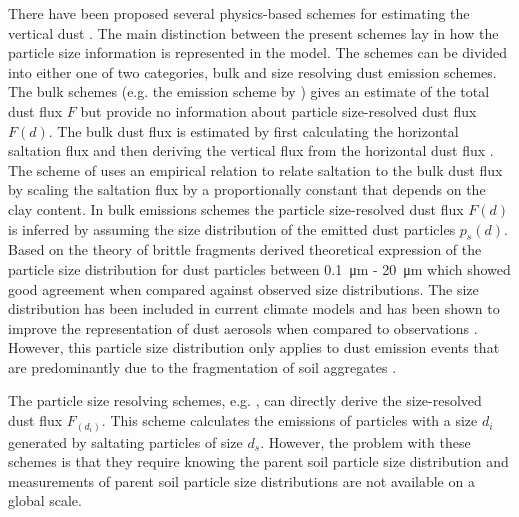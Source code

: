 There have been proposed several physics-based schemes for estimating the vertical dust \parencite{MB95_dust_emission,alfaro2001modeling,shao2004simplification}. The main distinction between the present schemes lay in how the particle size information is represented in the model. The schemes can be divided into either one of two categories, bulk and size resolving dust emission schemes. The bulk schemes (e.g. the emission scheme by \parencite{MB95_dust_emission}) gives an estimate of the total dust flux $F$ but provide no information about particle size-resolved dust flux $F(d)$. The bulk dust flux is estimated by first calculating the horizontal saltation flux and then deriving the vertical flux from the horizontal dust flux \parencite{tegen2014numerical}. The scheme of \textcite{MB95_dust_emission} uses an empirical relation to relate saltation to the bulk dust flux by scaling the saltation flux by a proportionally constant that depends on the clay content. In bulk emissions schemes the particle size-resolved dust flux $F(d)$ is inferred by assuming the size distribution of the emitted dust particles $p_s(d)$. Based on the theory of brittle fragments \textcite{kok_scaling_2011} derived theoretical expression of the particle size distribution for dust particles between \SI{0.1}{\micro\metre} - \SI{20}{\micro\metre} which showed good agreement when compared against observed size distributions. The \textcite{kok_scaling_2011} size distribution has been included in current climate models and has been shown to improve the representation of dust aerosols when compared to observations \parencite{johnson2012global}. However, this particle size distribution only applies to dust emission events that are predominantly due to the fragmentation of soil aggregates \parencite{kok2012physics}.


The particle size resolving schemes, e.g. \textcite{shao2004simplification}, can directly derive the size-resolved dust flux $F_(d_i)$. This scheme calculates the emissions of particles with a size $d_i$ generated by saltating particles of size $d_s$. However, the problem with these schemes is that they require knowing the parent soil particle size distribution and measurements of parent soil particle size distributions are not available on a global scale.

